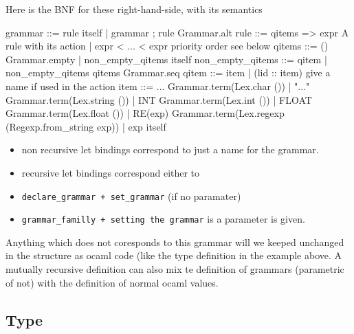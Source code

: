 \documentclass[11pt]{article}
\begin{document}
    Here is the BNF for these right-hand-side, with its semantics
    \begin{ocamldoccode}

    grammar ::= rule                                                   itself
           | grammar ; rule                                       Grammar.alt
    rule ::= qitems => expr                            A rule with its action
           | expr < ... < expr                       priority order see below
    qitems ::= ()                                               Grammar.empty
           | non_empty_qitems                                          itself
    non_empty_qitems ::= qitem
           | non_empty_qitems qitems                              Grammar.seq
    qitem ::= item | (lid :: item)          give a name if used in the action
    item ::= {\textquotesingle}...{\textquotesingle}                                  Grammar.term(Lex.char ())
           | "..."                                Grammar.term(Lex.string ())
           | INT                                     Grammar.term(Lex.int ())
           | FLOAT                                 Grammar.term(Lex.float ())
           | RE(exp)        Grammar.term(Lex.regexp (Regexp.from_string exp))
           | exp                                                       itself
    
\end{ocamldoccode}


\begin{itemize}
\item non recursive let bindings correspond to just a name for the grammar.
\item recursive let bindings correspond either to
\item {\tt{declare\_grammar + set\_grammar}} (if no paramater)
\item {\tt{grammar\_familly + setting the grammar}} is a parameter is given.
\end{itemize}

    Anything  which  does not  coresponds  to  this  grammar will  we  keeped
    unchanged in the structure as ocaml code (like the type definition in the
    example  above.   A  mutually  recursive   definition  can  also  mix  te
    definition of grammars (parametric of  not) with the definition of normal
    ocaml values.



\ocamldocvspace{0.5cm}



\subsection{Type}
\end{document}
